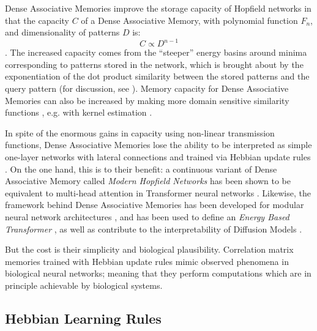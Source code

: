\documentclass{article}
\theoremstyle{definition}
\begin{document}
Dense Associative Memories improve the storage capacity of Hopfield networks
in that the capacity $C$ of a Dense Associative Memory, with
polynomial function $F_n$,
and dimensionality of patterns $D$ is:
\begin{equation}
  C \propto D^{n-1}
\end{equation}
\parencites{krotov_dense_2016,demircigil_model_2017,bao_capacity_2022}.
The increased capacity comes from the ``steeper'' energy basins
around minima corresponding to patterns stored in the network, which
is brought about by the exponentiation of the dot product similarity
between the stored patterns and the query pattern (for discussion, see
\textcite{kelly_memory_2017}). Memory capacity for Dense Associative
Memories can also be increased by making more domain sensitive
similarity functions \parencite{millidge_universal_2022},
e.g. with kernel estimation \parencite{hu_provably_2024,wu_uniform_2024}.

In spite of the enormous gains in capacity using non-linear
transmission functions, Dense Associative Memories lose the ability
to be interpreted as simple one-layer networks with lateral connections
and trained via Hebbian update rules
\parencites{krotov_large_2021,mcalister_sequential_2025}.
On the one hand, this is to their benefit: a continuous variant of
Dense Associative
Memory called \textit{Modern Hopfield Networks} has been shown to be
equivalent to multi-head attention in Transformer neural networks
\parencites{ramsauer_hopfield_2021,vaswani_attention_2023}. Likewise,
the framework behind Dense Associative Memories has been developed for
modular neural network architectures \parencite{krotov_hierarchical_2021},
and has been used to define an \textit{Energy Based Transformer}
\parencite{hoover_energy_2023}, as well as contribute to the interpretability
of Diffusion Models \parencite{pham_memorization_2025}.

But the cost is their simplicity and biological plausibility.
Correlation matrix memories
trained with Hebbian update rules mimic observed phenomena in
biological neural networks; meaning that they perform computations
which are in principle achievable by biological systems.

\subsection{Hebbian Learning Rules}\label{sec:hebbian-learning-rules}
\end{document}
